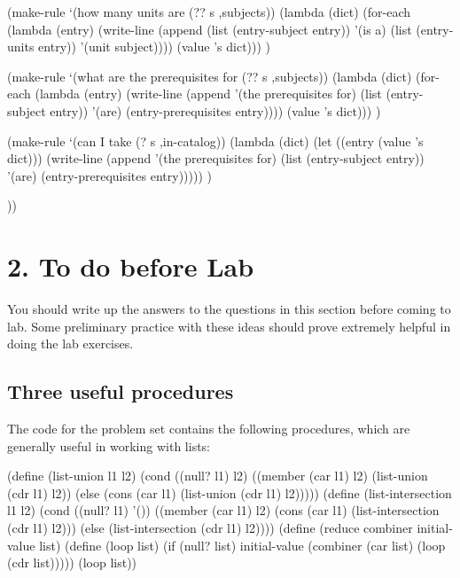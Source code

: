    (make-rule
    `(how many units are (?? s ,subjects))
    (lambda (dict)
      (for-each (lambda (entry)
                  (write-line
                   (append (list (entry-subject entry))
                           '(is a)
                           (list (entry-units entry))
                           '(unit subject))))
                (value 's dict))) )

   (make-rule
    `(what are the prerequisites for (?? s ,subjects))
    (lambda (dict)
      (for-each (lambda (entry)
                  (write-line
                   (append '(the prerequisites for)
                           (list (entry-subject entry))
                           '(are)
                           (entry-prerequisites entry))))
                (value 's dict))) )

   (make-rule
    `(can I take (? s ,in-catalog))
    (lambda (dict)
      (let ((entry (value 's dict)))
        (write-line
         (append '(the prerequisites for)
                 (list (entry-subject entry))
                 '(are)
                 (entry-prerequisites entry))))) )

   ))
\endlisp

\section{2. To do before Lab}

You should write up the answers to the questions in this section
before coming to lab.  Some preliminary practice with these ideas
should prove extremely helpful in doing the lab exercises.

\subsection{Three useful procedures}

The code for the problem set contains the following procedures, which
are generally useful in working with lists:

\beginlisp
(define (list-union l1 l2)
  (cond ((null? l1) l2)
        ((member (car l1) l2)
         (list-union (cdr l1) l2))
        (else
         (cons (car l1)
               (list-union (cdr l1) l2)))))
\null
(define (list-intersection l1 l2)
  (cond ((null? l1) '())
        ((member (car l1) l2)
         (cons (car l1)
               (list-intersection (cdr l1) l2)))
        (else (list-intersection (cdr l1) l2))))
\null
(define (reduce combiner initial-value list)
  (define (loop list)
    (if (null? list)
        initial-value
        (combiner (car list) (loop (cdr list)))))
  (loop list))
\endlisp

